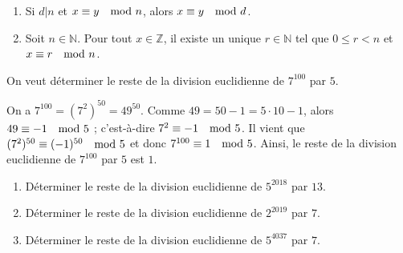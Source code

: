       \begin{prop}
            \begin{enumerate}
                  \item Si $d|n$ et $x \equiv y \quad \mathrm{mod}\ n$, alors $x \equiv y \quad \mathrm{mod}\ d$.
                  \item Soit $n\in\mathbb{N}$.
                        Pour tout $x\in\mathbb{Z}$, il existe un unique $r\in\mathbb{N}$ tel que
                        $0\leq r < n$ et $x \equiv r \quad \mathrm{mod}\ n$.
            \end{enumerate}
      \end{prop}
      \begin{ex}
            On veut d\'eterminer le reste de la division euclidienne de $7^{100}$ par $5$.
            
            On a $7^{100} = (7^2)^{50} = 49^{50}$.
            Comme $49 = 50 - 1 = 5 \cdot 10 - 1$,
            alors  $49 \equiv -1 \quad \mathrm{mod}\ 5$ ; c'est-\`a-dire $7^2 \equiv -1 \quad \mathrm{mod}\ 5$.
            Il vient que $(7^2)^{50} \equiv (-1)^{50} \quad \mathrm{mod}\ 5$ et donc $7^{100} \equiv 1 \quad \mathrm{mod}\ 5$.
            Ainsi, le reste de la division euclidienne de $7^{100}$ par $5$ est $1$.
      \end{ex}
      \begin{exe}
            \begin{enumerate}
                  \item D\'eterminer le reste de la division euclidienne de $5^{2018}$ par $13$.
                  \item D\'eterminer le reste de la division euclidienne de $2^{2019}$ par $7$.
                  \item D\'eterminer le reste de la division euclidienne de $5^{4037}$ par $7$.
            \end{enumerate}
      \end{exe}
